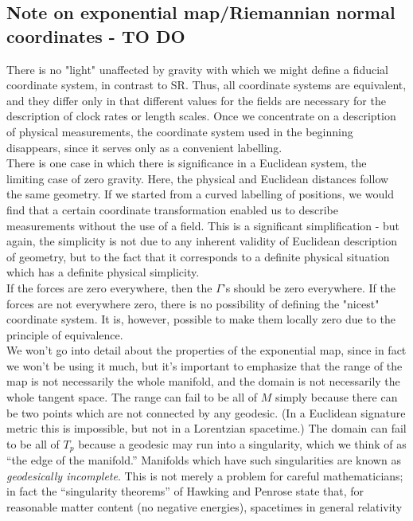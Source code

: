 \subsection{Note on exponential map/Riemannian normal coordinates - TO DO}
There is no "light" unaffected by gravity with which we might define a fiducial coordinate system, in contrast to SR. Thus, all coordinate systems are equivalent, and they differ only in that different values for the fields are necessary for the description of clock rates or length scales. Once we concentrate on a description of physical measurements, the coordinate system used in the beginning disappears, since it serves only as a convenient labelling.\\
There is one case in which there is significance in a Euclidean system, the limiting case of zero gravity. Here, the physical and Euclidean distances follow the same geometry. If we started from a curved labelling of positions, we would find that a certain coordinate transformation enabled us to describe measurements without the use of a field. This is a significant simplification - but again, the simplicity is not due to any inherent validity of Euclidean description of geometry, but to the fact that it corresponds to a definite physical situation which has a definite physical simplicity.
\\
If the forces are zero everywhere, then the $\Gamma$'s should be zero everywhere. If the forces are not everywhere zero, there is no possibility of defining the "nicest" coordinate system. It is, however, possible to make them locally zero due to the principle of equivalence.
\\
We won’t go into detail about the properties of the exponential map, since in fact we
won’t be using it much, but it’s important to emphasize that the range of the map is not
necessarily the whole manifold, and the domain is not necessarily the whole tangent space.
The range can fail to be all of $M$ simply because there can be two points which are not
connected by any geodesic. (In a Euclidean signature metric this is impossible, but not in
a Lorentzian spacetime.) The domain can fail to be all of $T_p$ because a geodesic may run
into a singularity, which we think of as “the edge of the manifold.” Manifolds which have
such singularities are known as \emph{geodesically incomplete}. This is not merely a problem
for careful mathematicians; in fact the “singularity theorems” of Hawking and Penrose state
that, for reasonable matter content (no negative energies), spacetimes in general relativity

